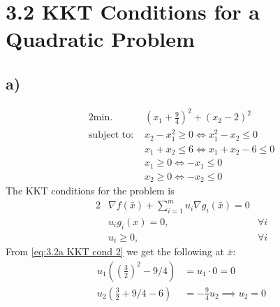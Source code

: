 \documentclass{article}
\begin{document}
\section*{3.2  KKT Conditions for a Quadratic Problem}
\subsection*{a)}
	\begin{alignat}{2}
		\text{min. } & (x_1 +\frac{9}{4})^2 + (x_2 - 2)^2 \\
		\text{subject to: } & x_2-x_1^2 \geq 0 \iff x_1^2-x_2 \leq 0\\
		& x_1 + x_2 \leq 6 \iff  x_1 + x_2 - 6 \leq 0\\
		& x_1 \geq 0 \iff -x_1 \leq 0\\
		& x_2 \geq 0 \iff -x_2 \leq 0
	\end{alignat}
	The KKT conditions for the problem is
	\begin{alignat}{2}
		&\nabla f(\bar{x}) + \sum_{i=1}^{m} u_i \nabla g_i(\bar{x}) = 0 \label{eq:3.2a KKT cond 1}\\
		& u_i g_i(x) = 0 , & \forall i \label{eq:3.2a KKT cond 2}\\
		& u_i \geq0, & \forall i
	\end{alignat}
	From \ref{eq:3.2a KKT cond 2} we get the following at $\bar{x}$:
	\begin{align}
		u_1\left(\left(\frac{3}{2}\right)^2 - 9/4\right) &= u_1 \cdot 0 = 0 \\
		u_2\left(\frac{3}{2} + 9/4 - 6 \right) &= -\frac{9}{4}u_2 \implies u_2 = 0
	\end{align}
\end{document}
